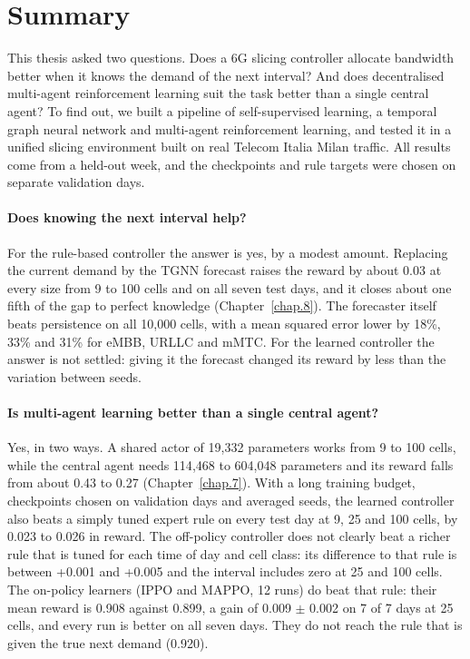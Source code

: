 \label{chap.10}
\section{Summary}
\label{Summary}
This thesis asked two questions. Does a 6G slicing controller allocate bandwidth better when it knows the demand of the next interval? And does decentralised multi-agent reinforcement learning suit the task better than a single central agent? To find out, we built a pipeline of self-supervised learning, a temporal graph neural network and multi-agent reinforcement learning, and tested it in a unified slicing environment built on real Telecom Italia Milan traffic. All results come from a held-out week, and the checkpoints and rule targets were chosen on separate validation days.

\paragraph{Does knowing the next interval help?}
For the rule-based controller the answer is yes, by a modest amount. Replacing the current demand by the TGNN forecast raises the reward by about 0.03 at every size from 9 to 100 cells and on all seven test days, and it closes about one fifth of the gap to perfect knowledge (Chapter~\ref{chap.8}). The forecaster itself beats persistence on all 10{,}000 cells, with a mean squared error lower by 18\%, 33\% and 31\% for eMBB, URLLC and mMTC. For the learned controller the answer is not settled: giving it the forecast changed its reward by less than the variation between seeds.

\paragraph{Is multi-agent learning better than a single central agent?}
Yes, in two ways. A shared actor of 19{,}332 parameters works from 9 to 100 cells, while the central agent needs 114{,}468 to 604{,}048 parameters and its reward falls from about 0.43 to 0.27 (Chapter~\ref{chap.7}). With a long training budget, checkpoints chosen on validation days and averaged seeds, the learned controller also beats a simply tuned expert rule on every test day at 9, 25 and 100 cells, by 0.023 to 0.026 in reward. The off-policy controller does not clearly beat a richer rule that is tuned for each time of day and cell class: its difference to that rule is between +0.001 and +0.005 and the interval includes zero at 25 and 100 cells. The on-policy learners (IPPO and MAPPO, 12 runs) do beat that rule: their mean reward is 0.908 against 0.899, a gain of 0.009 $\pm$ 0.002 on 7 of 7 days at 25 cells, and every run is better on all seven days. They do not reach the rule that is given the true next demand (0.920).

